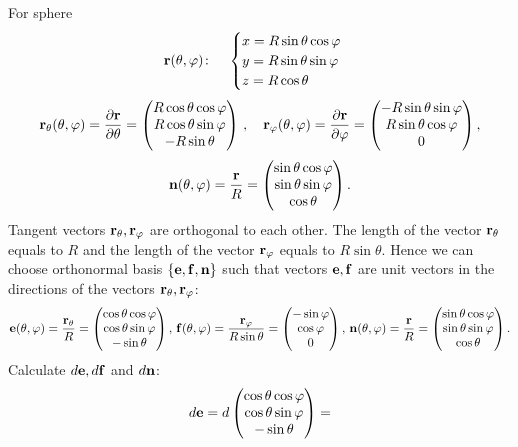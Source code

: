 \documentclass[12pt]{article}
\theoremstyle{theorem}
\numberwithin{equation}{section}
\begin{document}
{For sphere
\begin{equation}\label{surfacesphere11}
  {\bf r}(\theta,\varphi)\colon\quad
  \begin{cases}
  x=R\sin\theta\cos\varphi\\
  y=R\sin\theta\sin\varphi\\
  z=R\cos\theta\\
  \end{cases}
\end{equation}
    $$
  {\bf r}_\theta(\theta,\varphi)={\partial {\bf r}\over \partial \theta}=
  \begin{pmatrix}
        R\cos\theta\cos\varphi\cr
        R\cos\theta\sin\varphi\cr
        -R\sin\theta\cr
   \end{pmatrix}\,,
\quad
  {\bf r}_\varphi(\theta,\varphi)={\partial {\bf r}\over \partial \varphi}=
         \begin{pmatrix}
        -R\sin\theta\sin\varphi\cr
        R\sin\theta\cos\varphi\cr
          0\cr
   \end{pmatrix},
     $$
     $$
   {\bf n}(\theta,\varphi)={{\bf r}\over R}=
   \begin{pmatrix}
    \sin\theta\cos\varphi\cr
     \sin\theta\sin\varphi\cr
      \cos\theta\cr
   \end{pmatrix}.
  $$
Tangent vectors  ${\bf r}_\theta,{\bf r}_\varphi$ are orthogonal to each other.
The length of the vector ${\bf r}_\theta$ equals to $R$ and the
length of the vector ${\bf r}_\varphi$ equals to $R\sin\theta$.
Hence we can choose orthonormal basis $\{{\bf e},{\bf f},{\bf n}\}$ such that vectors ${\bf e},{\bf f}$ are unit vectors in the
directions of the vectors  ${\bf r}_\theta,{\bf r}_\varphi$:
         $$
    {\bf e}(\theta,\varphi)={{\bf r}_\theta\over R}=
         \begin{pmatrix}
        \cos\theta\cos\varphi\cr
        \cos\theta\sin\varphi\cr
        -\sin\theta\cr
   \end{pmatrix},\,
   {\bf f}(\theta,\varphi)={{\bf r}_\varphi\over R\sin\theta}=
        \begin{pmatrix}
        -\sin\varphi\cr
        \cos\varphi\cr
          0\cr
   \end{pmatrix},\,
     {\bf n}(\theta,\varphi)={{\bf r}\over R}=
   \begin{pmatrix}
    \sin\theta\cos\varphi\cr
     \sin\theta\sin\varphi\cr
      \cos\theta\cr
   \end{pmatrix}.
         $$
Calculate $d{\bf e}, d{\bf f}$ and $d{\bf n}$:
            $$
        d{\bf e}=d
        \begin{pmatrix}
        \cos\theta\cos\varphi\cr
        \cos\theta\sin\varphi\cr
        -\sin\theta\cr
   \end{pmatrix}=
$$}
\end{document}
